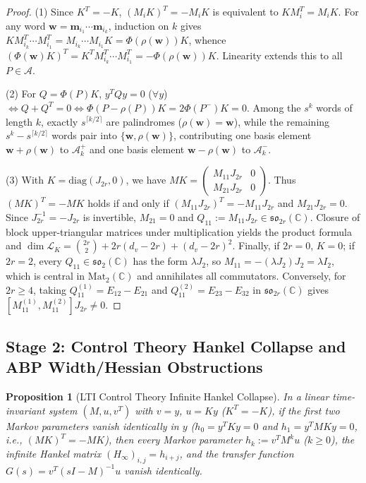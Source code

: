 \documentclass[11pt,a4paper]{article}
\newtheorem{proposition}[theorem]{Proposition}
\theoremstyle{definition}
\begin{document}
\begin{proof}
(1) Since $K^T = -K$, $(M_i K)^T = -M_i K$ is equivalent to $K M_i^T = M_i K$. For any word $\mathbf{w} = \mathbf{m}_{i_1}\cdots\mathbf{m}_{i_k}$, induction on $k$ gives $K M_{i_k}^T \cdots M_{i_1}^T = M_{i_k}\cdots M_{i_1} K = \Phi(\rho(\mathbf{w}))K$, whence $(\Phi(\mathbf{w})K)^T = K^T M_{i_k}^T\cdots M_{i_1}^T = -\Phi(\rho(\mathbf{w}))K$. Linearity extends this to all $P \in \mathcal{A}$.

(2) For $Q = \Phi(P)K$, $y^T Q y = 0$ ($\forall y$) $\iff Q + Q^T = 0 \iff \Phi(P - \rho(P))K = 2\Phi(P^-)K = 0$. Among the $s^k$ words of length $k$, exactly $s^{\lceil k/2 \rceil}$ are palindromes ($\rho(\mathbf{w}) = \mathbf{w}$), while the remaining $s^k - s^{\lceil k/2 \rceil}$ words pair into $\{\mathbf{w}, \rho(\mathbf{w})\}$, contributing one basis element $\mathbf{w} + \rho(\mathbf{w})$ to $\mathcal{A}_k^+$ and one basis element $\mathbf{w} - \rho(\mathbf{w})$ to $\mathcal{A}_k^-$.

(3) With $K = \mathrm{diag}(J_{2r}, 0)$, we have $MK = \left(\begin{smallmatrix} M_{11}J_{2r} & 0 \\ M_{21}J_{2r} & 0 \end{smallmatrix}\right)$. Thus $(MK)^T = -MK$ holds if and only if $(M_{11}J_{2r})^T = -M_{11}J_{2r}$ and $M_{21}J_{2r} = 0$. Since $J_{2r}^{-1} = -J_{2r}$ is invertible, $M_{21} = 0$ and $Q_{11} := M_{11}J_{2r} \in \mathfrak{so}_{2r}(\mathbb{C})$. Closure of block upper-triangular matrices under multiplication yields the product formula and $\dim \mathcal{L}_K = \binom{2r}{2} + 2r(d_v - 2r) + (d_v - 2r)^2$. Finally, if $2r = 0$, $K = 0$; if $2r = 2$, every $Q_{11} \in \mathfrak{so}_2(\mathbb{C})$ has the form $\lambda J_2$, so $M_{11} = -(\lambda J_2)J_2 = \lambda I_2$, which is central in $\mathrm{Mat}_2(\mathbb{C})$ and annihilates all commutators. Conversely, for $2r \ge 4$, taking $Q_{11}^{(1)} = E_{12} - E_{21}$ and $Q_{11}^{(2)} = E_{23} - E_{32}$ in $\mathfrak{so}_{2r}(\mathbb{C})$ gives $[M_{11}^{(1)}, M_{11}^{(2)}] J_{2r} \neq 0$.
\end{proof}

\subsection{Stage 2: Control Theory Hankel Collapse and ABP Width/Hessian Obstructions}

\begin{proposition}[LTI Control Theory Infinite Hankel Collapse]\label{prop:hankel}
In a linear time-invariant system $(M, u, v^T)$ with $v = y$, $u = Ky$ ($K^T = -K$), if the first two Markov parameters vanish identically in $y$ ($h_0 = y^T K y = 0$ and $h_1 = y^T M K y = 0$, i.e., $(MK)^T = -MK$), then every Markov parameter $h_k := v^T M^k u$ ($k \ge 0$), the infinite Hankel matrix $(H_\infty)_{i,j} = h_{i+j}$, and the transfer function $G(s) = v^T(sI - M)^{-1}u$ vanish identically.
\end{proposition}
\end{document}
